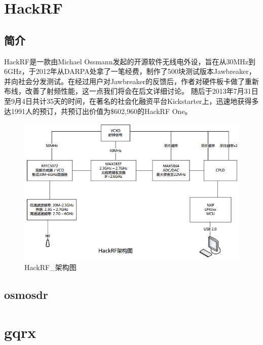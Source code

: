 \section{HackRF}
	\subsection{简介}
	\par HackRF是一款由Michael Ossmann发起的开源软件无线电外设，旨在从30MHz到6GHz，于2012年从DARPA处拿了一笔经费，制作了500块测试版本Jawbreaker，并向社会分发测试。在经过用户对Jawbreaker的反馈后，作者对硬件板卡做了重新布线，改善了射频性能，这一点我们将会在后文详细讨论。 随后于2013年7月31日至9月4日共计35天的时间，在著名的社会化融资平台Kickstarter上，迅速地获得多达1991人的预订，共预订出价值为\$602,960的HackRF One。
	\begin{figure}[htb]
		\centering
		\includegraphics[width=13cm]{figures/HackRF_Schematic.png}
		\caption{HackRF\_架构图}
	\label{fig:HackRF_架构}
	\end{figure}
	\subsection{osmosdr}
\section{gqrx}
